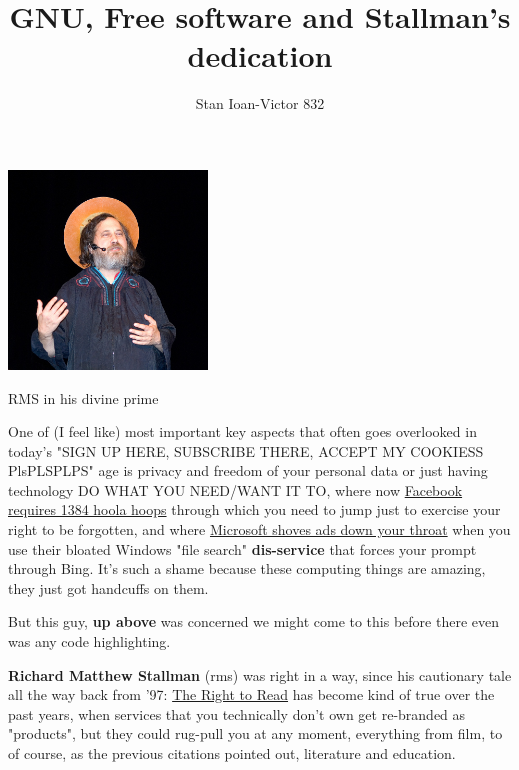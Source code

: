 \documentclass[sigplan,screen]{acmart}
\begin{document}
\title{GNU, Free software and Stallman's dedication}

\author{Stan Ioan-Victor 832}

\begin{teaserfigure}
	\includegraphics[width=200px]{pics/jesus-stallman.jpg}
	\centering
	\caption{RMS in his divine prime}
	\label{fig:teaser}
\end{teaserfigure}

\maketitle

One of (I feel like) most important key aspects that often goes overlooked in today's "SIGN UP HERE, SUBSCRIBE THERE, ACCEPT MY COOKIESS PlsPLSPLPS" age is privacy and freedom of your personal data or just having technology DO WHAT YOU NEED/WANT IT TO, where now \href{https://www.youtube.com/watch?v=MPyJBJTHyO0}{Facebook requires 1384 hoola hoops}\cite{tantacrul} through which you need to jump just to exercise your right to be forgotten, and where \href{https://www.youtube.com/watch?v=LZzubS1ILTs}{Microsoft shoves ads down your throat}\cite{jakey} when you use their bloated Windows "file search" \textbf{dis-service}\cite{BarraDRM} that forces your prompt through Bing. It's such a shame because these computing things are amazing, they just got handcuffs on them.

But this guy, \textbf{up above} was concerned we might come to this before there even was any code highlighting.

\textbf{Richard Matthew Stallman} (rms) was right in a way, since his cautionary tale all the way back from '97: \href{https://www.gnu.org/philosophy/right-to-read.html}{The Right to Read}\cite{Stallman1997TheRT} has become kind of true over the past years, when services that you technically don't own get re-branded as "products"\cite{product}, but they could rug-pull you at any moment, everything from film\cite{jellyfin}, to of course, as the previous citations pointed out, literature and education.
\end{document}
